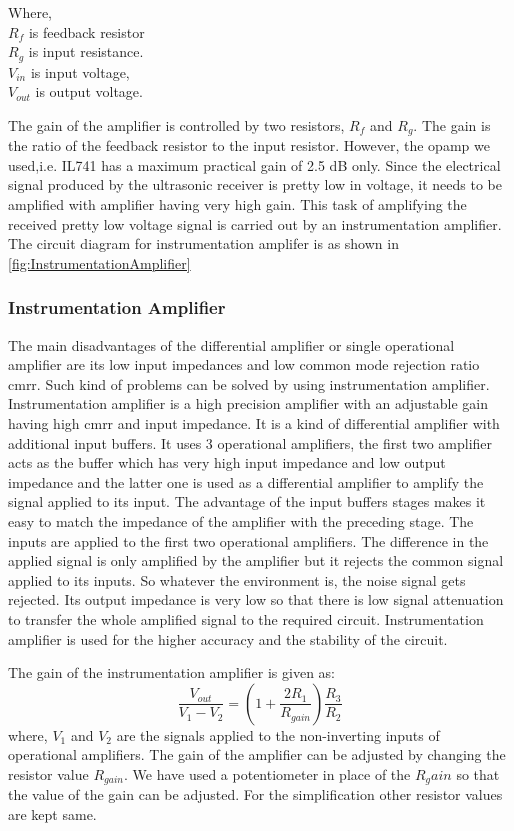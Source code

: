 Where,\\ $R_f$ is feedback resistor \\$R_g$ is input resistance. \\$V_{in}$ is input voltage, \\$V_{out}$ is output voltage. 

The gain of the amplifier is controlled by two resistors, $R_f$ and $R_g$. The gain is the ratio of the feedback resistor to the input resistor. However, the opamp we used,i.e. IL741 has a maximum practical gain of 2.5 dB only. Since the electrical signal produced by the ultrasonic receiver is pretty low in voltage, it needs to be amplified with amplifier having very high gain. This task of amplifying the received pretty low voltage signal is carried out by an instrumentation amplifier. The circuit diagram for instrumentation amplifer is as shown in \ref{fig:InstrumentationAmplifier}

\subsubsection{Instrumentation Amplifier}
The main disadvantages of the differential amplifier or single operational amplifier are its low input impedances and low common mode rejection ratio \gls{cmrr}.  Such kind of problems can be solved by using instrumentation amplifier. Instrumentation amplifier is a high precision amplifier with an adjustable gain having high \gls{cmrr} and input impedance. It is a kind of differential amplifier with additional input buffers. It uses 3 operational amplifiers, the first two amplifier acts as the buffer which has very high input impedance and low output impedance and the latter one is used as a differential amplifier to amplify the signal applied to its input. The advantage of the input buffers stages makes it easy to match the impedance of the amplifier with the preceding stage. The inputs are applied to the first two operational amplifiers. The difference in the applied signal is only amplified by the amplifier but it rejects the common signal applied to its inputs. So whatever the environment is, the noise signal gets rejected. Its output impedance is very low so that there is low signal attenuation to transfer the whole amplified signal to the required circuit. Instrumentation amplifier is used for the higher accuracy and the stability of the circuit.



The gain of the instrumentation amplifier is given as:
\begin{equation}
	\frac{V_{out}}{V_1-V_2}=(1+\frac{2R_1}{R_{gain}})\frac{R_3}{R_2}
\end{equation}
where, $V_1$ and $V_2$ are the signals applied to the non-inverting inputs of operational amplifiers. The gain of the amplifier can be adjusted by changing the resistor value $R_{gain}$. We have used a potentiometer in place of the $R_gain$ so that the value of the gain can be adjusted. For the simplification other resistor values are kept same. 

